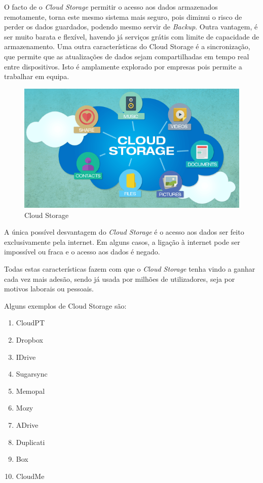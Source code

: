 \documentclass{report}
\begin{document}
O facto de o \textit{Cloud Storage} permitir o acesso aos dados armazenados remotamente, torna este mesmo sistema mais seguro, pois diminui o risco de perder os dados guardados, podendo mesmo servir de \textit{Backup}. 
Outra vantagem, é ser muito barata e flexível, havendo já serviços grátis com limite de capacidade de armazenamento. 
Uma outra características do Cloud Storage  é a sincronização, que permite que as atualizações de dados sejam compartilhadas em tempo real entre dispositivos. Isto é amplamente explorado por empresas pois permite a trabalhar em equipa.
\vspace{1mm}

	\begin{figure} [b]
		\centering
		\includegraphics[scale=0.4]{cloud-storage.png}
		\caption{Cloud Storage}
	\end{figure}

A única possível desvantagem do \textit{Cloud Storage} é o acesso aos dados ser feito exclusivamente pela internet. Em alguns casos, a ligação à internet pode ser impossível ou fraca e o acesso aos dados é negado.

\newpage

Todas estas características fazem com que o \textit{Cloud Storage} tenha vindo a ganhar cada vez mais adesão, sendo já usada por milhões de utilizadores, seja por motivos laborais ou pessoais.
\vspace{1mm}

	Alguns exemplos de Cloud Storage são:
	\begin{enumerate}
		\item CloudPT
		\item  Dropbox
		\item  IDrive
		\item Sugarsync
		\item Memopal
		\item Mozy
		\item ADrive
		\item Duplicati
		\item Box
		\item CloudMe
	\end{enumerate} 
	
\end{document}
